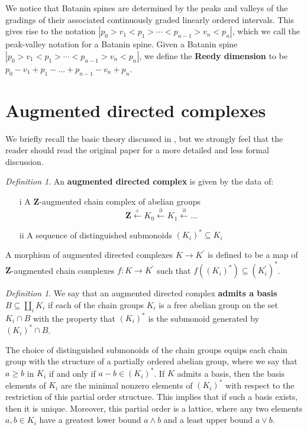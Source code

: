 \documentclass[10pt]{amsart}
\numberwithin{equation}{section}
\theoremstyle{plain}   %
\theoremstyle{remark}
\newtheorem{defn}[subsection]{Definition}
\theoremstyle{plain}
\newcommand{\dfn}{\textbf}
\begin{document}
We notice that Batanin spines are determined by the peaks and valleys of the gradings of their associated continuously graded linearly ordered intervals.  This gives rise to the notation \(|p_0>v_1<p_1>\cdots<p_{n-1}>v_n<p_n|\), which we call the peak-valley notation for a Batanin spine.  Given a Batanin spine \(|p_0>v_1<p_1>\cdots<p_{n-1}>v_n<p_n|\), we define the \dfn{Reedy dimension} to be \(p_0 -v_1 + p_1 -\dots + p_{n-1} - v_n +p_n\).  

\section{Augmented directed complexes}
We briefly recall the basic theory discussed in \cite{steiner-2004}, but we strongly feel that the reader should read the original paper for a more detailed and less formal discussion.
\begin{defn} An \dfn{augmented directed complex} is given by the data of:
\begin{enumerate} 
\item[i] A \(\mathbf{Z}\)-augmented chain complex of abelian groups \[\mathbf{Z} \xleftarrow{\varepsilon} K_0\xleftarrow{\partial} K_1 \xleftarrow{\partial}\dots\]
\item[ii] A sequence of distinguished submonoids \((K_i)^\ast \subseteq K_i\)
\end{enumerate}
A morphism of augmented directed complexes \(K\to K^\prime\) is defined to be a map of \(\mathbf{Z}\)-augmented chain complexes \(f:K\to K^\prime\) such that \(f((K_i)^\ast)\subseteq (K^\prime_i)^\ast\).  
\end{defn}
\begin{defn}
We say that an augmented directed complex \dfn{admits a basis} \(B\subseteq \coprod_i K_i\) if each of the chain groups \(K_i\) is a free abelian group on the set \(K_i\cap B\) with the property that \((K_i)^\ast\) is the submonoid generated by \((K_i)^\ast\cap B\).  
\end{defn}
The choice of distinguished submonoids of the chain groups equips each chain group with the structure of a partially ordered abelian group, where we say that \(a\geq b\) in \(K_i\) if and only if \(a-b \in (K_i)^\ast\).  If \(K\) admits a basis, then the basis elements of \(K_i\) are the minimal nonzero elements of \((K_i)^\ast\) with respect to the restriction of this partial order structure. This implies that if such a basis exists, then it is unique. Moreover, this partial order is a lattice, where any two elements \(a,b \in K_i\) have a greatest lower bound \(a\wedge b\) and a least upper bound \(a\vee b\).  
\end{document}
